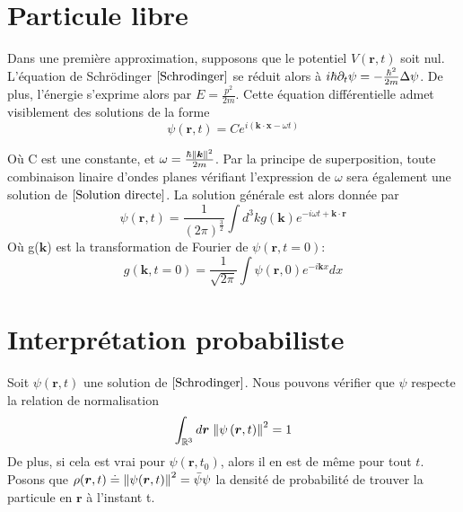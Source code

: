 \documentclass[../notesdecours]{subfiles}
\begin{document}
\section{Particule libre}

Dans une première approximation, supposons que le potentiel $V(\bm{r},t)$ soit nul. L'équation de Schrödinger $\eqref{Schrodinger}$ se réduit alors à $i\hbar \partial_t \psi = - \frac{\hbar^2}{2m} \Delta \psi$. De plus, l'énergie s'exprime alors par $E = \frac{p^2}{2m}$. Cette équation différentielle admet visiblement des solutions de la forme
\begin{equation}
\label{Solution directe}
\psi (\bm{r},t) = Ce^{i(\bm{k} \cdot \bm{x} - \omega t)}
\end{equation}

Où C est une constante, et $\omega = \frac{\hbar \norm{\bm{k}}^2}{2m}$. Par la principe de superposition, toute combinaison linaire d'ondes planes vérifiant l'expression de $\omega$ sera également une solution de $\eqref{Solution directe}$. La solution générale est alors donnée par 
\begin{equation}
\label{Solution générale}
\psi (\bm{r},t) = \frac{1}{\left( 2 \pi \right)^{\frac{3}{2}}}\int d^3k g(\bm{k}) e^{-i \omega t + \bm{k} \cdot \bm{r}}
\end{equation}
Où g($\bm{k}$) est la transformation de Fourier de $\psi (\bm{r},t = 0)$:
\begin{equation}
g(\bm{k},t=0) = \frac{1}{\sqrt{2\pi}} \int \psi (\bm{r},0)e^{-i\bm{k}x} dx
\end{equation}

\section{Interprétation probabiliste}

Soit $\psi (\bm{r},t)$ une solution de $\eqref{Schrodinger}$. Nous pouvons vérifier que $\psi$ respecte la relation de normalisation
\begin{equation}
    \int_{\mathbb{R}^3} d\bm{r} \; \norm{\psi\left(\bm{r},t\right)}^2 = 1
\end{equation}
De plus, si cela est vrai pour $\psi(\bm{r},t_0)$, alors il en est de même pour tout $t$.\\

Posons que $\rho (\bm{r},t) \doteq \norm{\psi (\bm{r},t)}^2 = \bar{\psi} \psi$ la densité de probabilité de trouver la particule en $\bm{r}$ à l'instant t.\\
\end{document}
